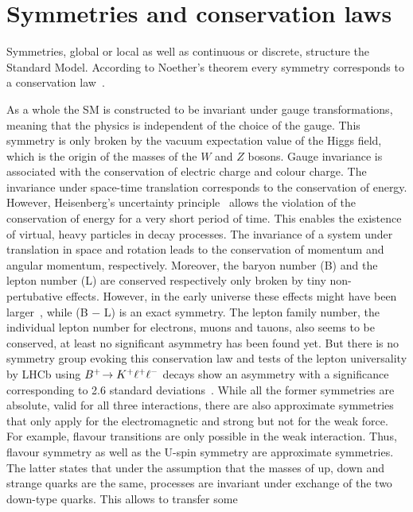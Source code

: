 
\section{Symmetries and conservation laws}
\label{sec:standardmodel:symmetries}

Symmetries, global or local as well as continuous or discrete, structure the
Standard Model. According to Noether's theorem every symmetry corresponds to a
conservation law~\cite{Noether}.

As a whole the SM is constructed to be invariant under gauge transformations,
meaning that the physics is independent of the choice of the gauge. This
symmetry is only broken by the vacuum expectation value of the Higgs field,
which is the origin of the masses of the $W$ and $Z$ bosons. Gauge invariance
is associated with the conservation of electric charge and colour charge. The
invariance under space-time translation corresponds to the conservation of
energy. However, Heisenberg's uncertainty principle~\cite{Heisenberg:1927zz}
allows the violation of the conservation of energy for a very short period of
time. This enables the existence of virtual, heavy particles in decay
processes. The invariance of a system under translation in space and rotation
leads to the conservation of momentum and angular momentum, respectively.
Moreover, the baryon number (B) and the lepton number (L) are conserved
respectively only broken by tiny non-pertubative effects. However, in the
early universe these effects might have been larger~\cite{Rubakov:1996vz},
while (B $-$ L) is an exact symmetry. The lepton family number, \ie the
individual lepton number for electrons, muons and tauons, also seems to be
conserved, at least no significant asymmetry has been found yet. But there is
no symmetry group evoking this conservation law and tests of the lepton
universality by LHCb using \mbox{${{B}^+}\!\rightarrow {\ensuremath{{K}^+}}\ell^+\ell^-$} decays show an
asymmetry with a significance corresponding to \num{2.6} standard
deviations~\cite{LHCb-PAPER-2014-024}. While all the former symmetries are
absolute, \ie valid for all three interactions, there are also approximate
symmetries that only apply for the electromagnetic and strong but not for the
weak force. For example, flavour transitions are only possible in the weak
interaction. Thus, flavour symmetry as well as the U-spin symmetry are
approximate symmetries. The latter states that under the assumption that the
masses of up, down and strange quarks are the same, processes are invariant
under exchange of the two down-type quarks. This allows to transfer some
